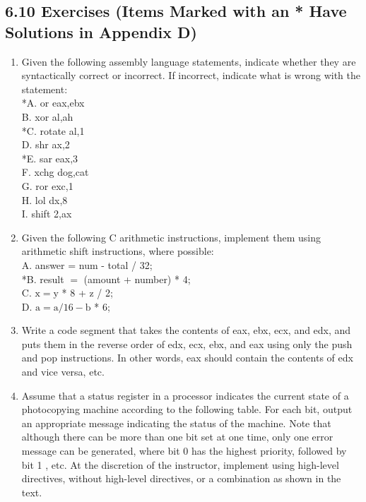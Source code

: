 \documentclass[10pt]{article}
\begin{document}
\subsection*{6.10 Exercises (Items Marked with an * Have Solutions in Appendix D)}
\begin{enumerate}
  \item Given the following assembly language statements, indicate whether they are syntactically correct or incorrect. If incorrect, indicate what is wrong with the statement:\\
*A. or eax,ebx\\
B. xor al,ah\\
*C. rotate al,1\\
D. shr ax,2\\
*E. sar eax,3\\
F. xchg dog,cat\\
G. ror exc,1\\
H. lol dx,8\\
I. shift 2,ax
  \item Given the following C arithmetic instructions, implement them using arithmetic shift instructions, where possible:\\
A. answer = num - total / 32;\\
*B. result $=$ (amount + number) * 4;\\
C. $\mathrm{x}=\mathrm{y}$ * 8 + z / 2;\\
D. $\mathrm{a}=\mathrm{a} / 16-\mathrm{b}$ * 6;
  \item Write a code segment that takes the contents of eax, ebx, ecx, and edx, and puts them in the reverse order of edx, ecx, ebx, and eax using only the push and pop instructions. In other words, eax should contain the contents of edx and vice versa, etc.
  \item Assume that a status register in a processor indicates the current state of a photocopying machine according to the following table. For each bit, output an appropriate message indicating the status of the machine. Note that although there can be more than one bit set at one time, only one error message can be generated, where bit 0 has the highest priority, followed by bit 1 , etc. At the discretion of the instructor, implement using high-level directives, without high-level directives, or a combination as shown in the text.
\end{enumerate}
\end{document}
